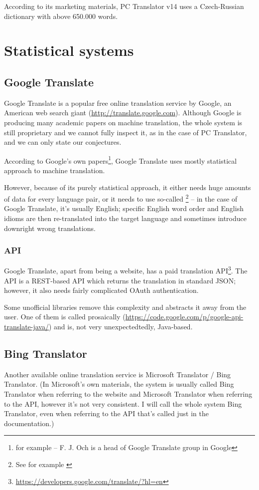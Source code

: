 According to its marketing materials, PC Translator v14 uses a Czech-Russian dictionary with above 650.000 words.

\section{Statistical systems}

\subsection{Google Translate}
\label{google}
Google Translate is a popular free online translation service by Google, an American web search giant (\url{http://translate.google.com}). 
Although Google is producing many academic papers on machine translation, the whole system is still proprietary and we cannot fully inspect it, as in the case of PC Translator, and we can only state our conjectures.

According to Google's own papers\footnote{for example \cite{och} -- F. J. Och is a head of Google Translate group in Google}, Google Translate uses mostly statistical approach to machine translation.

However, because of its purely statistical approach, it either needs huge amounts of data for every language pair, or it needs to use so-called \footnote{See for example \cite{koehn2010statistical}} -- in the case of Google Translate, it's usually English; specific English word order and English idioms are then re-translated into the target language and sometimes introduce downright wrong translations.

\subsubsection{API}
Google Translate, apart from being a website, has a paid translation API\footnote{\url{https://developers.google.com/translate/?hl=en}}. The API is a REST-based API which returns the translation in standard JSON; however, it also needs fairly complicated OAuth authentication.

Some unofficial libraries remove this complexity and abstracts it away from the user.
One of them is called prosaically  (\url{https://code.google.com/p/google-api-translate-java/}) and is, not very unexpectedtedly, Java-based.


\subsection{Bing Translator}
\label{bing}
Another available online translation service is Microsoft Translator / Bing Translator. (In Microsoft's own materials, the system is usually called Bing Translator when referring to the website and Microsoft Translator when referring to the API, however it's not very consistent. I will call the whole system Bing Translator, even when referring to the API that's called just  in the documentation.)

